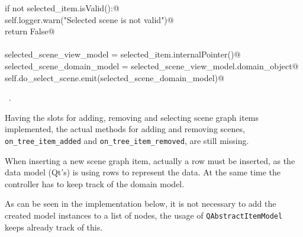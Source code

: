 \documentclass[
    a4paper,      %
    10pt,         %
    openright,    %
    notitlepage,  %
    parskip=half, %
]{scrreprt}       %
\theoremstyle{definition}                    %
\begin{document}
\begin{flushleft}
\begin{minipage}{\linewidth}
\begin{list}{}{}
\mbox{}\lstinline@    if not selected_item.isValid():@\\
\mbox{}\lstinline@        self.logger.warn("Selected scene is not valid")@\\
\mbox{}\lstinline@        return False@\\
\mbox{}\lstinline@@\\
\mbox{}\lstinline@    selected_scene_view_model = selected_item.internalPointer()@\\
\mbox{}\lstinline@    selected_scene_domain_model  = selected_scene_view_model.domain_object@\\
\mbox{}\lstinline@    self.do_select_scene.emit(selected_scene_domain_model)@{\NWsep}
\end{list}
\vspace{-1.5ex}
\footnotesize
\begin{list}{}{\setlength{\itemsep}{-\parsep}\setlength{\itemindent}{-\leftmargin}}
\item \NWtxtMacroRefIn\ .

\item{}
\end{list}
\end{minipage}\vspace{4ex}
\end{flushleft}
Having the slots for adding, removing and selecting scene graph items
implemented, the actual methods for adding and removing scenes,
\verb+on_tree_item_added+ and \verb+on_tree_item_removed+, are still missing.

When inserting a new scene graph item, actually a row must be inserted, as the
data model (Qt's) is using rows to represent the data. At the same time the
controller has to keep track of the domain model.

As can be seen in the implementation below, it is not necessary to add the
created model instances to a list of nodes, the usage of
\verb+QAbstractItemModel+ keeps already track of this.
\end{document}
